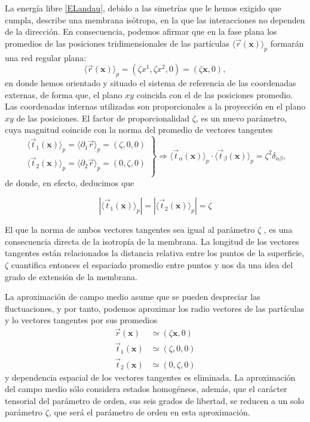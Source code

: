 La energía libre \eqref{ELandau}, debido a las simetrías que le hemos exigido
que cumpla, describe una membrana isótropa, en la que las interacciones no
dependen de la dirección. En consecuencia, podemos afirmar que en la fase
plana los promedios de las posiciones tridimensionales de las partículas
$\langle\vec{r}(\mathbf{x})\rangle_{p}$ formarán una red regular plana:  
\begin{equation*}
 \langle\vec{r}(\mathbf{x})\rangle_{p}=(\zeta x^1,\zeta x^2,0)=(\zeta \mathbf{x},0), 
\end{equation*}
en donde hemos orientado y situado el sistema de referencia de las coordenadas
externas, de forma que, el plano $xy$ coincida con el de las
posiciones promedio. Las coordenadas internas utilizadas son 
proporcionales a la proyección en el plano $xy$ de las posiciones. El factor
de proporcionalidad $\zeta$, es un nuevo parámetro, cuya magnitud coincide con
la norma del promedio de  vectores tangentes 
\begin{equation}
 \left.\begin{array}{c}
\langle\vec{t}_{1}(\mathbf{x})\rangle_{p}=\langle\partial_1\vec{r}\rangle_{p}=(\zeta ,0,0)\\
\langle\vec{t}_{2}(\mathbf{x})\rangle_{p}=\langle\partial_2\vec{r}\rangle_{p}=(0,\zeta ,0)\\
 \end{array}\right\}\Rightarrow
\langle\vec{t}_{\alpha}(\mathbf{x})\rangle_{p}\cdot\langle\vec{t}_{\beta}(\mathbf{x})\rangle_{p}=\zeta^2 \delta_{\alpha\beta},
\end{equation}
de donde, en efecto, deducimos que

\begin{equation*}
|\langle\vec{t}_1(\mathbf{x})\rangle_{p}|=|\langle\vec{t}_2(\mathbf{x})\rangle_{p}|=\zeta
\end{equation*}

El que la norma de ambos vectores tangentes sea igual al parámetro $\zeta$ , es
una consecuencia directa de la isotropía de la membrana. La longitud de los
vectores tangentes están relacionados la distancia relativa entre los puntos
de la superficie, $\zeta$ cuantifica entonces el espaciado promedio entre
puntos y nos da una idea del grado de extensión de la membrana.

La aproximación de campo medio asume que se pueden despreciar las
fluctuaciones, y por tanto, podemos aproximar los radio vectores de las
partículas y lo vectores tangentes por sus promedios
\begin{align*}
 \vec{r}(\mathbf{x})&\simeq(\zeta \mathbf{x},0)\\
 \vec{t}_1(\mathbf{x})&\simeq(\zeta ,0,0)\\
 \vec{t}_2(\mathbf{x})&\simeq(0,\zeta,0)
\end{align*}
y dependencia espacial de los vectores tangentes es eliminada. La
aproximación del campo medio sólo considera estados homogéneos, además, que
el carácter tensorial del parámetro de orden, sus seis grados de libertad, se
reducen a un solo parámetro $\zeta$, que será el parámetro de orden en esta
aproximación.

